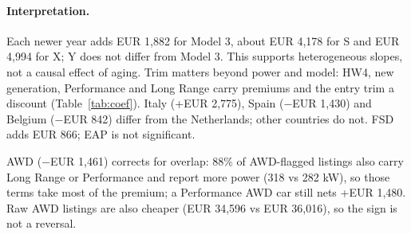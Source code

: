 \paragraph{Interpretation.} Each newer year adds EUR 1,882 for Model 3, about EUR 4,178 for S and EUR 4,994 for X; Y does not differ from Model 3. This supports heterogeneous slopes, not a causal effect of aging. Trim matters beyond power and model: HW4, new generation, Performance and Long Range carry premiums and the entry trim a discount (Table~\ref{tab:coef}). Italy (+EUR 2,775), Spain ($-$EUR 1,430) and Belgium ($-$EUR 842) differ from the Netherlands; other countries do not. FSD adds EUR 866; EAP is not significant.

AWD ($-$EUR 1,461) corrects for overlap: 88\% of AWD-flagged listings also carry Long Range or Performance and report more power (318 vs 282 kW), so those terms take most of the premium; a Performance AWD car still nets +EUR 1,480. Raw AWD listings are also cheaper (EUR 34,596 vs EUR 36,016), so the sign is not a reversal.